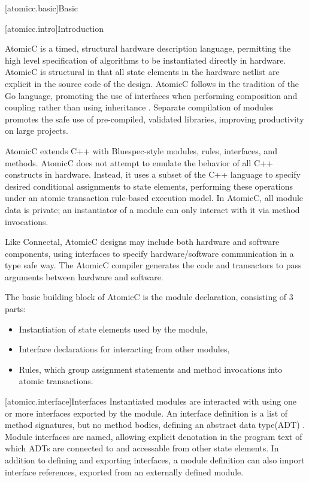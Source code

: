 [atomicc.basic]{Basic}

[atomicc.intro]{Introduction}

AtomicC is a timed, structural hardware description language, permitting
the high level specification of algorithms to be instantiated
directly in hardware.
AtomicC is structural in that all state elements in the hardware
netlist are explicit in the source code of the design.
AtomicC follows in the tradition of the Go language,
promoting the use of interfaces when performing composition and
coupling rather than using inheritance \cite{Pike2012}.
Separate compilation of modules promotes the safe use of pre-compiled, validated
libraries, improving productivity on large projects.

AtomicC extends C++
with Bluespec-style\cite{Bluespec:www,Hoe:Thesis,HoeArvind:TRS_Synthesis2}
modules, rules, interfaces, and methods.
AtomicC does not attempt to emulate the behavior of all C++ constructs in hardware.
Instead, it uses a subset of the C++ language to specify desired
conditional assignments to state elements,
performing these operations under an atomic transaction rule-based execution model.
In AtomicC, all module data is private; an instantiator of a module can only 
interact with it via method invocations.

Like Connectal, AtomicC designs may include both hardware and
software components, using interfaces to specify hardware/software communication
in a type safe way. The AtomicC compiler generates the code and transactors to pass
arguments between hardware and software.

The basic building block of AtomicC is the module declaration,
consisting of 3 parts:
\begin{itemize}
\item Instantiation of state elements used by the module,
\item Interface declarations for interacting from other modules,
\item Rules, which group assignment statements and method invocations into atomic transactions.
\end{itemize}

[atomicc.interface]{Interfaces}
Instantiated modules are interacted with using one or more interfaces exported by the module.
An interface definition is a list of method signatures, but no method bodies, defining
an abstract data type(ADT) \cite{Liskov74programmingwith}.
Module interfaces are named, 
allowing explicit denotation in the program text
of which ADTs are connected to and accessable from other state elements.
In addition to defining and exporting interfaces,
a module definition can also import
interface references, exported from an
externally defined module.

